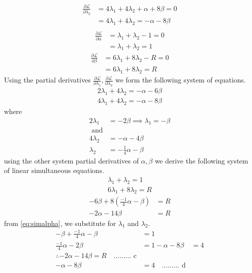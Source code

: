 \documentclass[12pt,a4paper]{article}
\begin{document}
\begin{align*}
		\frac{ \partial \mathcal{L}  }{  \partial \lambda_2}   &= 4 \lambda_1  + 4 \lambda_2 + \alpha + 8  \beta =  0\\
		 &= 4 \lambda_1  + 4 \lambda_2  = - \alpha -  8  \beta\\
\end{align*}
\begin{align*}
		\frac{ \partial \mathcal{L}  }{  \partial \alpha}   &=   \lambda_1 + \lambda_2  -  1 = 0\\
		&= \lambda_1  + \lambda_2  =  1
\end{align*}
\begin{align*}
		\frac{ \partial \mathcal{L}  }{  \partial \beta}   &=   6\lambda_1 + 8 \lambda_2  -  R  = 0\\
		&=6 \lambda_1  + 8\lambda_2  =  R
\end{align*}
Using the partial derivatives $ \frac{ \partial \mathcal{L}  }{  \partial \lambda_1} ,  \frac{ \partial \mathcal{L}  }{  \partial \lambda_2}$ we form the following system of equations.
\begin{eqnarray}
			\label{eq:simalpha}
		2 \lambda_1  + 4 \lambda_2 =  - \alpha -  6 \beta \\
		\label{eq:simbeta}
		4 \lambda_1  + 4 \lambda_2  = - \alpha -  8  \beta
\end{eqnarray}
where 
\begin{align*}
		2 \lambda_1  &=  -2 \beta \implies \lambda_1  =  -\beta\\
		\text{ and}\\
		4 \lambda_2   &=  - \alpha  - 4\beta \\
	  \lambda_2  &=  - \frac{1}{4} \alpha  -  \beta
\end{align*}
using the other system partial derivatives of $\alpha,  \beta $ we derive the following system of linear simultaneous equations.
\begin{eqnarray}
	     \lambda_1  + \lambda_2  =  1\\
     6 \lambda_1  + 8\lambda_2  =  R
\end{eqnarray}
\begin{align*}
	-6 \beta  +  8(\frac{-1}{4} \alpha  -  \beta )   &=  R\\
	-2\alpha   -  14 \beta  &= R 
\end{align*}
from \eqref{eq:simalpha},  we substitute for $ \lambda_1 $ and $ \lambda_2 $.
\begin{align*}
		-\beta  + \frac{-1}{4} \alpha  -  \beta  &= 1\\
		\frac{-1}{4} \alpha  -  2 \beta  &=  1
		-\alpha - 8\beta &=  4\\
		\therefore  -2 \alpha  -  14 \beta   =  R \quad \text{......... c}\\
		   -\alpha  - 8\beta  &=  4  \quad \text{......... d}
\end{align*} 
\end{document}

